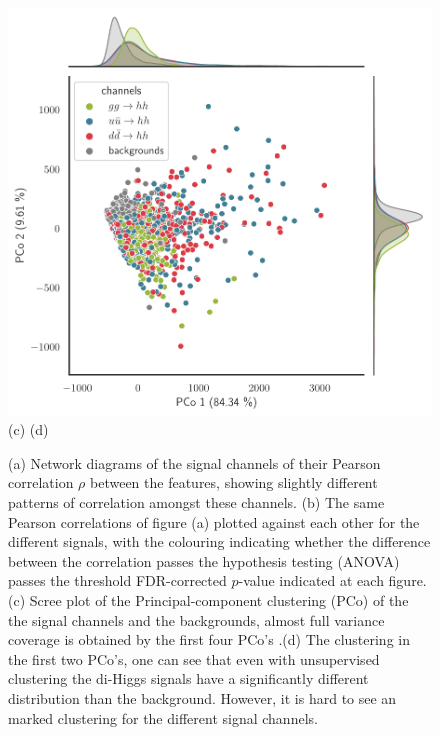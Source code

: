 \begin{figure}[h!]
						\includegraphics[height=0.25\textheight]{fig/netzwerk/pca_unsupervised-1}\\
							  \hspace{.8 cm} 			  { \footnotesize  (c)}    \hspace{6. cm}        { \footnotesize  (d)} 
	\caption{(a) Network diagrams of the signal channels of their Pearson correlation $\rho$ between the features, showing slightly different patterns of correlation amongst these channels. (b) The same  Pearson correlations of figure (a) plotted against each other for the different signals, with the colouring indicating whether the difference between the correlation passes the hypothesis testing (ANOVA) passes the threshold  FDR-corrected $p$-value indicated at each figure. (c) Scree plot of the Principal-component clustering (PCo) of the the signal channels and the backgrounds, almost full variance coverage is obtained by the first four PCo's .(d) The clustering in the first two PCo's, one can see that even with unsupervised clustering the di-Higgs signals have a significantly different distribution than the background. However, it is hard to see an marked clustering for the different signal channels.}
	\label{fig:cor-net}
\end{figure}
\FloatBarrier
